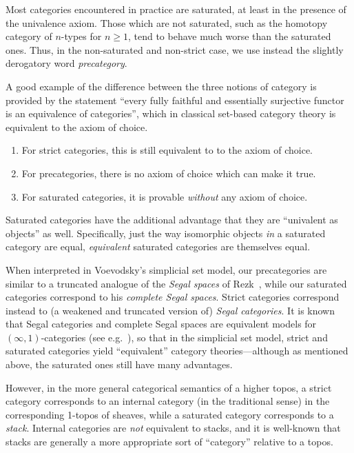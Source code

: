 \documentclass{amsart}
\theoremstyle{definition}
\theoremstyle{remark}
\numberwithin{equation}{section}
\begin{document}
Most categories encountered in practice are saturated, at least in the presence of the univalence axiom.
Those which are not saturated, such as the homotopy category of $n$-types for $n\ge 1$, tend to behave much worse than the saturated ones.
Thus, in the non-saturated and non-strict case, we use instead the slightly derogatory word \emph{precategory}.

A good example of the difference between the three notions of category is provided by the statement ``every fully faithful and essentially surjective functor is an equivalence of categories'', which in classical set-based category theory is equivalent to the axiom of choice.
\begin{enumerate}
\item For strict categories, this is still equivalent to to the axiom of choice.
\item For precategories, there is no axiom of choice which can make it true.
\item For saturated categories, it is provable \emph{without} any axiom of choice.\label{item:satnoac}
\end{enumerate}
Saturated categories have the additional advantage that they are ``univalent as objects'' as well.
Specifically, just the way isomorphic objects \emph{in} a saturated category are equal, \emph{equivalent} saturated categories are themselves equal.

When interpreted in Voevodsky's simplicial set model, our precategories are similar to a truncated analogue of the \emph{Segal spaces} of Rezk~\cite[Sec.~14]{rezk01css}, while our saturated categories correspond to his \emph{complete Segal spaces}.
Strict categories correspond instead to (a weakened and truncated version of) \emph{Segal categories}.
It is known that Segal categories and complete Segal spaces are equivalent models for $(\infty,1)$-categories (see e.g.~\cite{bergner:infty-one}), so that in the simplicial set model, strict and saturated categories yield ``equivalent'' category theories---although as mentioned above, the saturated ones still have many advantages.

However, in the more general categorical semantics of a higher topos, a strict category corresponds to an internal category (in the traditional sense) in the corresponding 1-topos of sheaves, while a saturated category corresponds to a \emph{stack}.
Internal categories are \emph{not} equivalent to stacks, and it is well-known that stacks are generally a more appropriate sort of ``category'' relative to a topos.
\end{document}
